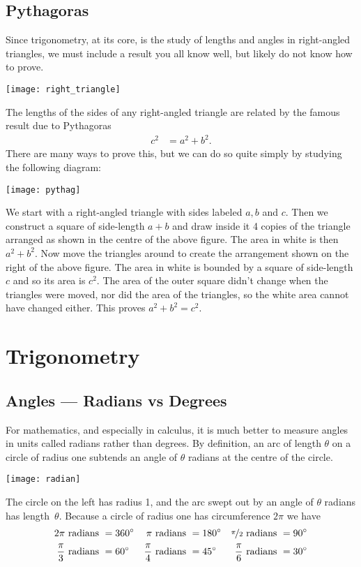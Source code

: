 \subsection{Pythagoras}\label{ssec_B_1_2}
Since trigonometry, at its core, is the study of lengths and angles in right-angled
triangles, we must include a result you all know well, but likely do not know how to
prove.
\begin{center}
  \texttt{[image: right\_triangle]}
\end{center}
The lengths of the sides of any right-angled triangle are related by the famous result due to Pythagoras
\begin{align*}
  c^2 &= a^2+b^2.
\end{align*}
There are many ways to prove this, but we can do so quite simply by studying the following diagram:
\begin{center}
  \texttt{[image: pythag]}
\end{center}
We start with a right-angled triangle with sides labeled $a,b$ and $c$. Then we construct a square of side-length $a+b$ and draw inside it 4 copies of the triangle arranged as shown in the centre of the above figure. The area in white is then $a^2+b^2$. Now move the triangles around to create the arrangement shown on the right of the above figure. The area in white is bounded by a square of side-length $c$ and so its area is $c^2$. The area of the outer square didn't change when the triangles were moved, nor did the area of the triangles, so the white area cannot have changed either. This proves $a^2+b^2=c^2$.


\section{Trigonometry}\label{sec_B_2}
\subsection{Angles --- Radians vs Degrees}\label{ssec rad deg}
For mathematics, and especially in calculus, it is much better to measure angles in units
called radians rather than degrees. By definition, an arc of length $\theta$ on a circle
of radius one subtends an angle of $\theta$ radians at the centre of the
circle.
\begin{center}
 \texttt{[image: radian]}
\end{center}
The circle on the left has radius 1, and the arc swept out by an angle of
$\theta$ radians has length~$\theta$. Because a circle of radius one has circumference
$2\pi$ we have
\begin{align*}
   2\pi\text{ radians }&=360^\circ &
    \pi\text{ radians }&=180^\circ &
    \nicefrac{\pi}{2}\text{ radians }&=90^\circ \\
  \frac{\pi}{3}\text{ radians }&=60^\circ &
  \frac{\pi}{4}\text{ radians }&=45^\circ &
  \frac{\pi}{6}\text{ radians }&=30^\circ
\end{align*}

